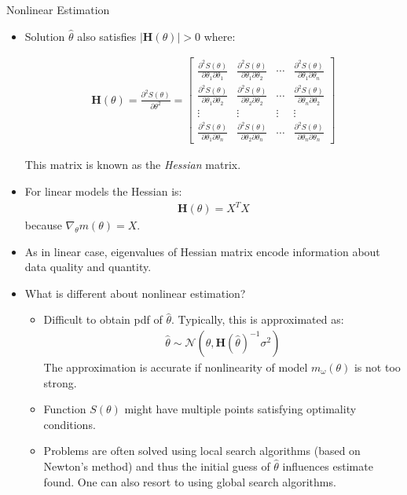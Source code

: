 \documentclass[9pt]{beamer}
\begin{document}
%
\begin{frame}{Nonlinear Estimation}

\begin{itemize}
\item Solution $\hat{\theta}$ also satisfies $|\mathbf{H}({\theta})|>0$ where:
\begin{footnotesize}
\begin{align*}
\mathbf{H}(\theta)=\frac{\partial^2 S(\theta)}{\partial \theta^2}=
\left[\begin{array}{ccccccccc}
\frac{\partial^2 S(\theta)}{\partial \theta_1\partial \theta_1}&\frac{\partial^2 S(\theta)}{\partial \theta_1\partial \theta_2}&\cdots& \frac{\partial^2 S(\theta)}{\partial \theta_1\partial \theta_n}\\
\frac{\partial^2 S(\theta)}{\partial \theta_1\partial \theta_2}&\frac{\partial^2 S(\theta)}{\partial \theta_2\partial \theta_2}&\cdots&\frac{\partial^2 S(\theta)}{\partial \theta_n\partial \theta_2}\\
\vdots & \vdots &\vdots &\vdots\\
\frac{\partial^2 S(\theta)}{\partial \theta_1\partial \theta_n}&\frac{\partial^2 S(\theta)}{\partial \theta_2\partial \theta_n}&\cdots& \frac{\partial^2 S(\theta)}{\partial \theta_n\partial \theta_n}
\end{array}\right]
\end{align*}
\end{footnotesize}
This matrix is known as the {\em Hessian} matrix. 
\item For linear models the Hessian is:
\begin{align*}
\mathbf{H}(\theta)=X^TX
\end{align*}
because  $\nabla_\theta m(\theta)=X$.  
\item As in linear case, eigenvalues of Hessian matrix encode information about data quality and quantity. 
\item What is different about nonlinear estimation?
\begin{itemize}
\item  Difficult to obtain pdf of $\hat{\theta}$. Typically, this is approximated as:
\begin{align*}
\hat{\theta}\sim\mathcal{N}(\theta,\mathbf{H}(\hat{\theta})^{-1}\sigma^2)
\end{align*}
The approximation is accurate if nonlinearity of model $m_\omega(\theta)$ is not too strong. 
\item Function $S(\theta)$ might have multiple points satisfying optimality conditions.  
\item Problems are often solved using local search algorithms (based on Newton's method) and thus the initial guess of $\hat{\theta}$ influences estimate found.  One can also resort to using global search algorithms. 
\end{itemize}
\end{itemize}
\end{frame}
\end{document}
